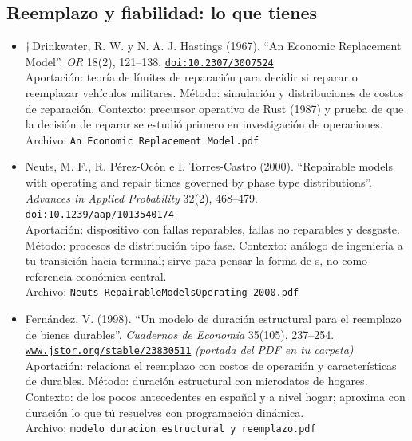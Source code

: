 \documentclass[11pt]{article}
\begin{document}
\subsection*{Reemplazo y fiabilidad: lo que tienes}
\begin{itemize}
\item $\dagger$\,Drinkwater, R. W. y N. A. J. Hastings (1967). ``An Economic Replacement Model''. \textit{OR} 18(2), 121--138. \href{https://doi.org/10.2307/3007524}{\texttt{doi:10.2307/3007524}}\\
Aportación: teoría de límites de reparación para decidir si reparar o reemplazar vehículos militares. Método: simulación y distribuciones de costos de reparación. Contexto: precursor operativo de Rust (1987) y prueba de que la decisión de reparar se estudió primero en investigación de operaciones.\\
{\footnotesize Archivo: \texttt{An Economic Replacement Model.pdf}}
\item Neuts, M. F., R. Pérez-Ocón e I. Torres-Castro (2000). ``Repairable models with operating and repair times governed by phase type distributions''. \textit{Advances in Applied Probability} 32(2), 468--479. \href{https://doi.org/10.1239/aap/1013540174}{\texttt{doi:10.1239/aap/1013540174}}\\
Aportación: dispositivo con fallas reparables, fallas no reparables y desgaste. Método: procesos de distribución tipo fase. Contexto: análogo de ingeniería a tu transición hacia terminal; sirve para pensar la forma de s, no como referencia económica central.\\
{\footnotesize Archivo: \texttt{Neuts-RepairableModelsOperating-2000.pdf}}
\item Fernández, V. (1998). ``Un modelo de duración estructural para el reemplazo de bienes durables''. \textit{Cuadernos de Economía} 35(105), 237--254. \href{https://www.jstor.org/stable/23830511}{\texttt{www.jstor.org/stable/23830511}} \textit{(portada del PDF en tu carpeta)}\\
Aportación: relaciona el reemplazo con costos de operación y características de durables. Método: duración estructural con microdatos de hogares. Contexto: de los pocos antecedentes en español y a nivel hogar; aproxima con duración lo que tú resuelves con programación dinámica.\\
{\footnotesize Archivo: \texttt{modelo duracion estructural y reemplazo.pdf}}
\end{itemize}
\end{document}
